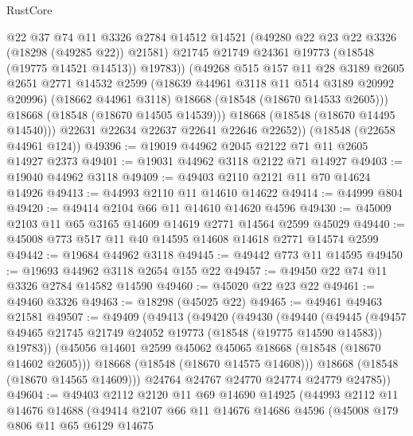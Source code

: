 \begin{lexlean}{RustCore}
\begin{coremodule}
                @22
                @37
                @74
                @11
                @3326
                @2784
                @14512
                @14521
                (@49280 @22 @23 @22 @3326 (@18298 (@49285 @22)) @21581)
                @21745
                @21749
                @24361
                @19773
                (@18548 (@19775 @14521 @14513))
                @19783))
            (@49268
              @515
              @157
              @11
              @28
              @3189
              @2605
              @2651
              @2771
              @14532
              @2599
              (@18639 @44961 @3118 @11 @514 @3189 @20992 @20996)
              (@18662 @44961 @3118)
              @18668
              (@18548 (@18670 @14533 @2605)))
            @18668
            (@18548 (@18670 @14505 @14539)))
          @18668
          (@18548 (@18670 @14495 @14540)))
        @22631
        @22634
        @22637
        @22641
        @22646
        @22652))
    (@18548 (@22658 @44961 @124))
@49396 := @19019 @44962 @2045 @2122 @71 @11 @2605 @14927 @2373
@49401 := @19031 @44962 @3118 @2122 @71 @14927
@49403 := @19040 @44962 @3118
@49409 := @49403 @2110 @2121 @11 @70 @14624 @14926
@49413 := @44993 @2110 @11 @14610 @14622
@49414 := @44999 @804
@49420 := @49414 @2104 @66 @11 @14610 @14620 @4596
@49430 := @45009 @2103 @11 @65 @3165 @14609 @14619 @2771 @14564 @2599 @45029
@49440 := @45008 @773 @517 @11 @40 @14595 @14608 @14618 @2771 @14574 @2599
@49442 := @19684 @44962 @3118
@49445 := @49442 @773 @11 @14595
@49450 := @19693 @44962 @3118 @2654 @155 @22
@49457 := @49450 @22 @74 @11 @3326 @2784 @14582 @14590
@49460 := @45020 @22 @23 @22
@49461 := @49460 @3326
@49463 := @18298 (@45025 @22)
@49465 := @49461 @49463 @21581
@49507 := @49409
    (@49413
      (@49420
        (@49430
          (@49440
            (@49445
              (@49457 @49465 @21745 @21749 @24052 @19773 (@18548 (@19775 @14590 @14583)) @19783))
            (@45056 @14601 @2599 @45062 @45065 @18668 (@18548 (@18670 @14602 @2605)))
            @18668
            (@18548 (@18670 @14575 @14608)))
          @18668
          (@18548 (@18670 @14565 @14609)))
        @24764
        @24767
        @24770
        @24774
        @24779
        @24785))
@49604 := @49403
    @2112
    @2120
    @11
    @69
    @14690
    @14925
    (@44993
      @2112
      @11
      @14676
      @14688
      (@49414
        @2107
        @66
        @11
        @14676
        @14686
        @4596
        (@45008
          @179
          @806
          @11
          @65
          @6129
          @14675

\end{coremodule}
\end{lexlean}
